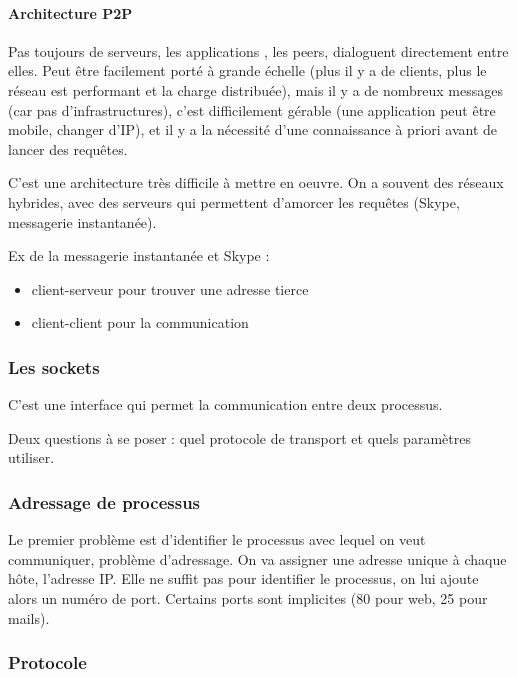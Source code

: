 		
	\paragraph{Architecture P2P}
		
	Pas toujours de serveurs, les applications , les peers, dialoguent directement entre elles. Peut être facilement porté à grande échelle (plus il y a de clients, plus le réseau est performant et la charge distribuée), mais il y a de nombreux messages (car pas d'infrastructures), c'est difficilement gérable (une application peut être mobile, changer d'IP), et il y a la nécessité d'une connaissance à priori avant de lancer des requêtes.
		
	C'est une architecture très difficile à mettre en oeuvre. On a souvent des réseaux hybrides, avec des serveurs qui permettent d'amorcer les requêtes (Skype, messagerie instantanée).
		
	Ex de la messagerie instantanée et Skype :
		
	\begin{itemize}
		\item client-serveur pour trouver une adresse tierce
		\item client-client pour la communication
	\end{itemize}
	

		\subsubsection{Les sockets}
		
		C'est une interface qui permet la communication entre deux processus.
		
		
		
		Deux questions à se poser : quel protocole de transport et quels paramètres utiliser.
		
		
		\subsubsection{Adressage de processus}			
		
		Le premier problème est d'identifier le processus avec lequel on veut communiquer, problème d'adressage. On va assigner une adresse unique à chaque hôte, l'adresse IP. Elle ne suffit pas pour identifier le processus, on lui ajoute alors un numéro de port. Certains ports sont implicites (80 pour web, 25 pour mails).
		
		\subsubsection{Protocole}
		
